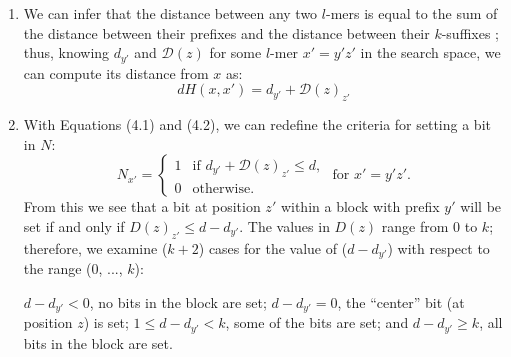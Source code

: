 \documentclass[oneside,12pt]{DISCSthesis}
\begin{document}
{\begin{enumerate}
				{\small\hspace*{40pt} Ex.\ \ \ \ For the block containing $l$-mers \{\texttt{acgttgcaaaaa} to \texttt{acgttgcttttt}\},
				\newline\hspace*{70pt} the prefix distance from $z$ = \texttt{acgtacgtacgt} is 
				\newline\hspace*{70pt} $d_{y'} = dH(\texttt{acgtacg}, \texttt{acgttgc}) = 3.$
				}

			\item We can infer that the distance between any two $l$-mers is equal to the sum of the distance between their prefixes and the distance between their $k$-suffixes %
			; thus, knowing $d_{y'}$ and $\mathcal{D}(z)$ for some $l$-mer $x' = y'z'$ in the search space, we can compute its distance from $x$ as:
				\begin{equation}
					dH(x,x') = d_{y'} + \mathcal{D}(z)_{z'}
					\end{equation}

			\item With Equations (4.1) and (4.2), we can redefine the criteria for setting a bit in $N$:
				\begin{equation}
					N_{x'} = \left\{
					\begin{array}{rl}
						1 & \text{if } d_{y'} + \mathcal{D}(z)_{z'} \leq d,\\
						0 & \text{otherwise.}%
					\end{array} \right.
					\text{ for }x' = y'z'.
					\end{equation}
				From this we see that a bit at position $z'$ within a block with prefix $y'$ will be set if and only if $D(z)_{z'} \leq d-d_{y'}$. The values in $D(z)$ range from 0 to $k$; therefore, we examine ($k + 2$) cases for the value of ($d - d_{y'}$) with respect to the range (0, ..., $k$):

					{\small
					\hspace*{40pt}{\bf\boldmath Case $-1$:}
					\hspace*{54pt} $d-d_{y'} < 0$, \hspace*{24pt}no bits in the block are set;\newline
					\hspace*{40pt}{\bf\boldmath Case 0:}
					\hspace*{66pt} $d-d_{y'} = 0$, \hspace*{24pt}the ``center'' bit (at position $z$) is set;\newline
					\hspace*{40pt}{\bf\boldmath\boldmath Cases 1 to $k-1$:}
					\hspace*{11.5pt} $1 \leq d-d_{y'} < k$, \hspace*{5pt}some of the bits are set; and\newline
					\hspace*{40pt}{\bf\boldmath Case $k$:}
					\hspace*{66pt}$d-d_{y'} \geq k$, \hspace*{24pt}all bits in the block are set.}


\end{enumerate}}
\end{document}
